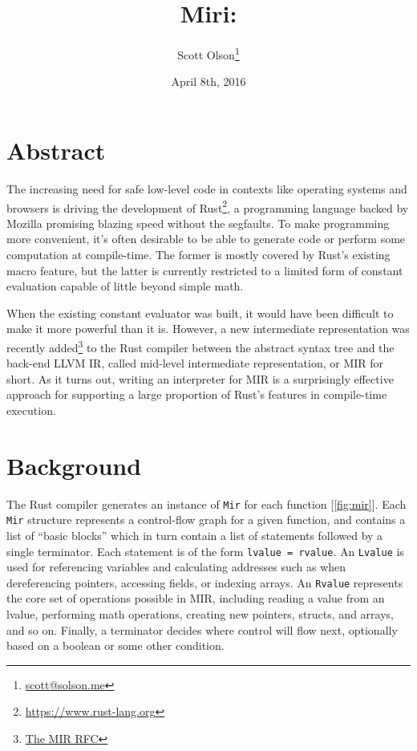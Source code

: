 \documentclass[twocolumn]{article}
\newcommand{\rust}[1]{\texttt{#1}}
\begin{document}
\title{Miri: \\ }
\author{Scott Olson\footnote{\href{mailto:scott@solson.me}{scott@solson.me}} \\
  }
\date{April 8th, 2016}
\maketitle


\section{Abstract}

The increasing need for safe low-level code in contexts like operating systems and browsers is
driving the development of Rust\footnote{\url{https://www.rust-lang.org}}, a programming language
backed by Mozilla promising blazing speed without the segfaults. To make programming more
convenient, it's often desirable to be able to generate code or perform some computation at
compile-time. The former is mostly covered by Rust's existing macro feature, but the latter is
currently restricted to a limited form of constant evaluation capable of little beyond simple math.

When the existing constant evaluator was built, it would have been difficult to make it more
powerful than it is. However, a new intermediate representation was recently
added\footnote{\href{https://github.com/rust-lang/rfcs/blob/master/text/1211-mir.md}{The MIR RFC}}
to the Rust compiler between the abstract syntax tree and the back-end LLVM IR, called mid-level
intermediate representation, or MIR for short. As it turns out, writing an interpreter for MIR is a
surprisingly effective approach for supporting a large proportion of Rust's features in compile-time
execution.


\section{Background}

The Rust compiler generates an instance of \rust{Mir} for each function [\autoref{fig:mir}]. Each
\rust{Mir} structure represents a control-flow graph for a given function, and contains a list of
``basic blocks'' which in turn contain a list of statements followed by a single terminator. Each
statement is of the form \rust{lvalue = rvalue}. An \rust{Lvalue} is used for referencing variables
and calculating addresses such as when dereferencing pointers, accessing fields, or indexing arrays.
An \rust{Rvalue} represents the core set of operations possible in MIR, including reading a value
from an lvalue, performing math operations, creating new pointers, structs, and arrays, and so on.
Finally, a terminator decides where control will flow next, optionally based on a boolean or some
other condition.
\end{document}
